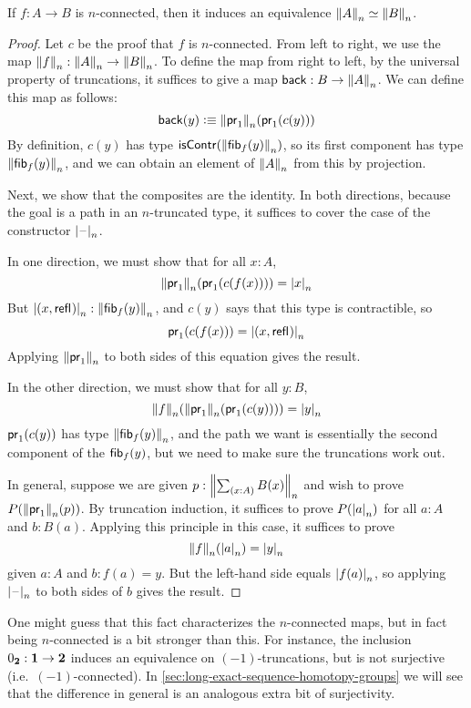 \begin{lem} \label{lem:connected-map-equiv-truncation}
If $f : A \to B$ is $n$-connected, then it induces an equivalence
$\eqv{\trunc{n}{A}}{\trunc{n}{B}}$.
\end{lem}
\begin{proof}
Let $c$ be the proof that $f$ is $n$-connected.  From left to right, we
use the map $\trunc{n}{f} : \trunc{n}{A} \to \trunc{n}{B}$.
To define the map from right to left, by the universal property of
truncations, it suffices to give a map $\mathsf{back} : B \to {\trunc{n}{A}}$.  We can
define this map as follows:
\[
\mathsf{back}(y) \defeq \trunc{n}{\proj{1}}{(\proj{1}{(c(y))})}
\]
By definition, $c(y)$ has type $\iscontr(\trunc n {\hfiber{f}y})$, so its
first component has type $\trunc n{\hfiber{f}y}$, and we can obtain an
element of $\trunc n A$ from this by projection.

Next, we show that the composites are the identity.  In both directions,
because the goal is a path in an $n$-truncated type, it suffices to
cover the case of the constructor $\tprojf{n}$.

In one direction, we must show that for all $x:A$, 
\[
\trunc{n}{\proj{1}}{(\proj{1}{(c(f(x)))})} = \tproj{n}{x}
\]
But $\tproj{n}{(x , \refl{})} : \trunc n{\hfiber{f}y}$, and
$c(y)$ says that this type is contractible, so 
\[
\proj{1}{(c(f(x)))} = \tproj{n}{(x , \refl{})}
\]
Applying $\trunc{n}{\proj{1}}$ to both sides of this equation gives the
result.  

In the other direction, we must show that for all $y:B$, 
\[
\trunc{n}{f}(\trunc{n}{\proj{1}} (\proj{1}{(c(y))})) = \tproj{n}{y}
\]
$\proj{1}{(c(y))}$ has type $\trunc n {\hfiber{f}y}$, and the path we
want is essentially the second component of the $\hfiber{f}y$, but we
need to make sure the truncations work out.  

In general, suppose we are given $p:\trunc{n}{\sm{x:A} B(x)}$ and wish to prove
$P(\trunc{n}{\proj{1}{}}(p))$. By truncation induction, it suffices to
prove $P(\tproj{n}{a})$ for all $a:A$ and $b:B(a)$.  Applying this
principle in this case, it suffices to prove
\[
\trunc{n}{f}(\tproj{n}{a}) = \tproj{n}{y}
\]
given $a:A$ and $b:f (a) = y$.  But the left-hand side equals $\tproj{n}{f (a)}$,
so applying $\tprojf{n}$ to both sides of $b$ gives the result.
\end{proof}

One might guess that this fact characterizes the $n$-connected maps, but in fact being $n$-connected is a bit stronger than this.
For instance, the inclusion $\bfalse:\unit \to\bool$ induces an equivalence on $(-1)$-truncations, but is not surjective (i.e.\ $(-1)$-connected).
In \autoref{sec:long-exact-sequence-homotopy-groups} we will see that the difference in general is an analogous extra bit of surjectivity.


